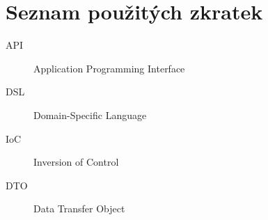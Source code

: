 \chapter{Seznam použitých zkratek}
\begin{description}
	\item[API] Application Programming Interface
	\item[DSL] Domain-Specific Language
	\item[IoC] Inversion of Control
	\item[DTO] Data Transfer Object
\end{description}
